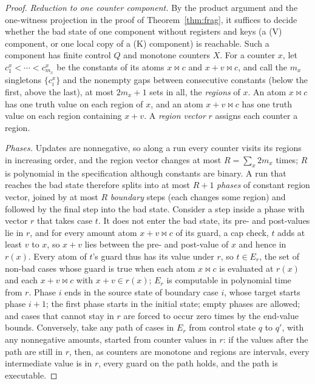 \begin{proof}
\emph{Reduction to one counter component.} By the product argument and the one-witness projection in the proof of
Theorem~\ref{thm:frag}, it suffices to decide whether the bad state of one component without registers and keys (a (V) component,
or one local copy of a (K) component) is reachable. Such a component has finite control $Q$ and monotone counters $X$. For a counter
$x$, let $c^x_1<\cdots<c^x_{m_x}$ be the constants of its atoms $x\bowtie c$ and $x+v\bowtie c$, and call the $m_x$ singletons
$\{c^x_i\}$ and the nonempty gaps between consecutive constants (below the first, above the last), at most $2m_x+1$ sets in all,
the \emph{regions} of $x$. An atom
$x\bowtie c$ has one truth value on each region of $x$, and an atom $x+v\bowtie c$ has one truth value on each region containing
$x+v$. A \emph{region vector} $r$ assigns each counter a region.

\emph{Phases.} Updates are nonnegative, so along a run every counter visits its regions in increasing order, and the region vector
changes at most $R=\sum_x 2m_x$ times; $R$ is polynomial in the specification although constants are binary. A run that reaches the
bad state therefore splits into at most $R+1$ \emph{phases} of constant region vector, joined by at most $R$ \emph{boundary} steps (each
changes some region) and followed by the final step into the bad state. Consider a step inside a phase with vector $r$ that takes
case $t$. It does not enter the bad state, its pre- and post-values lie in $r$, and for every amount atom $x+v\bowtie c$ of its guard,
a cap check, $t$ adds at least $v$ to $x$, so $x+v$ lies between the pre- and post-value of $x$ and hence in $r(x)$. Every atom of
$t$'s guard thus has its value under $r$, so $t\in E_r$, the set of non-bad cases whose guard is true when each atom $x\bowtie c$ is
evaluated at $r(x)$ and each $x+v\bowtie c$ with $x+v\in r(x)$; $E_r$ is computable in polynomial time from $r$. Phase $i$ ends in the
source state of boundary case $i$, whose target starts phase $i+1$; the first phase starts in the initial state; empty phases are
allowed; and cases that cannot stay in $r$ are forced to occur zero times by the end-value bounds.
Conversely, take any path of cases in $E_r$ from control state $q$ to $q'$, with any nonnegative amounts, started from counter values in
$r$: if the values after the path are still in $r$, then, as counters are monotone and regions are intervals, every intermediate
value is in $r$, every guard on the path holds, and the path is executable.


\end{proof}
